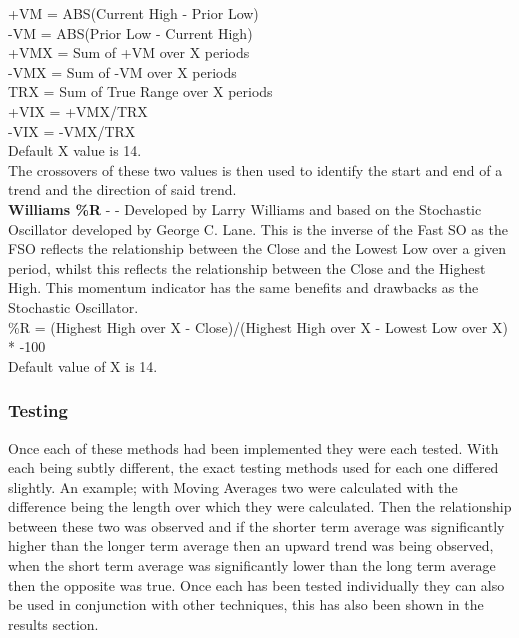 \documentclass[12pt,a4paper]{article}
\begin{document}
\noindent
+VM = ABS(Current High - Prior Low)\\
-VM = ABS(Prior Low - Current High)\\

\noindent
+VMX = Sum of +VM over X periods \\
-VMX = Sum of -VM over X periods \\

\noindent
TRX = Sum of True Range over X periods \\

\noindent
+VIX = +VMX/TRX \\
-VIX = -VMX/TRX \\

\noindent
Default X value is 14.\\

\noindent
The crossovers of these two values is then used to identify the start and end of a trend and the direction of said trend.\\

\iffalse
[]
\fi

\noindent
\textbf{Williams \%R} - \cite{Murphy1999} - Developed by Larry Williams and based on the Stochastic Oscillator developed by George C. Lane. This is the inverse of the Fast SO as the FSO reflects the relationship between the Close and the Lowest Low over a given period, whilst this reflects the relationship between the Close and the Highest High. This momentum indicator has the same benefits and drawbacks as the Stochastic Oscillator.\\

\noindent
\%R = (Highest High over X - Close)/(Highest High over X - Lowest Low over X) * -100\\
Default value of X is 14.

\iffalse
[]
\fi

\iffalse
#################################################################################
\fi

\subsubsection{Testing}

Once each of these methods had been implemented they were each tested. With each being subtly different, the exact testing methods used for each one differed slightly. An example; with Moving Averages two were calculated with the difference being the length over which they were calculated. Then the relationship between these two was observed and if the shorter term average was significantly higher than the longer term average then an upward trend was being observed, when the short term average was significantly lower than the long term average then the opposite was true. Once each has been tested individually they can also be used in conjunction with other techniques, this has also been shown in the results section. \\
\end{document}
